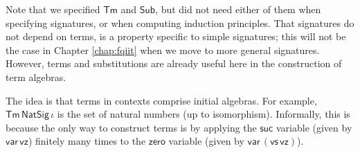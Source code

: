 \documentclass[12pt,a4paper,twoside,openany]{book}
\theoremstyle{remark}
\theoremstyle{definition}
\newcommand{\ms}[1]{\mathsf{#1}}
\newcommand{\Sub}{\mathsf{Sub}}
\newcommand{\Tm}{\mathsf{Tm}}
\newcommand{\var}{\ms{var}}
\newcommand{\vz}{\ms{vz}}
\newcommand{\vs}{\ms{vs}}
\begin{document}
Note that we specified $\Tm$ and $\Sub$, but did not need either of them when
specifying signatures, or when computing induction principles. That signatures
do not depend on terms, is a property specific to simple signatures; this will
not be the case in Chapter \ref{chap:fqiit} when we move to more general
signatures. However, terms and substitutions are already useful here in the
construction of term algebras.

The idea is that terms in contexts comprise initial algebras. For example,
$\Tm\,\ms{NatSig}\,\iota$ is the set of natural numbers (up to
isomorphism). Informally, this is because the only way to construct terms is by
applying the $\ms{suc}$ variable (given by $\var\,\vz$) finitely many times to
the $\ms{zero}$ variable (given by $\var\,(\vs\,\vz)$).

\begingroup
\allowdisplaybreaks
\end{document}
